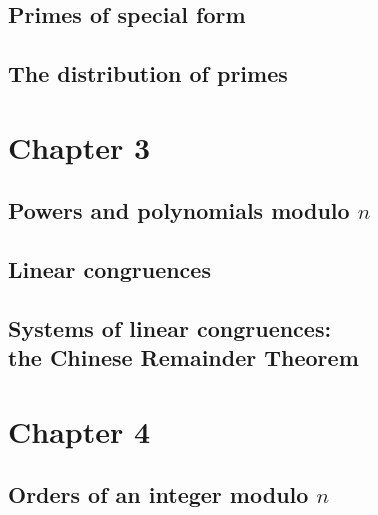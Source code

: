 \documentclass{article}
\numberwithin{equation}{thm}
\begin{document}



\subsection*{Primes of special form}




\subsection*{The distribution of primes}





\pagebreak



\section{Chapter 3}


\subsection*{Powers and polynomials modulo $n$}




\subsection*{Linear congruences}




\subsection*{Systems of linear congruences: \\ the Chinese Remainder Theorem}





\pagebreak



\section{Chapter 4}


\subsection*{Orders of an integer modulo $n$}
\end{document}
